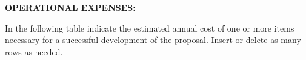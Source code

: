\documentclass[10pt]{article}
\begin{document}
\begin{comment}
\textbf{\uppercase{VIAJES DOMESTICOS: }}
\vspace{15pt}

\begin{tabular}{l|l|l|}
\cline{2-3}
                             & Destino & No. de días \\ \cline{2-3} 
                             &             &             \\ \hline
\multicolumn{1}{|l|}{Año 1} &   Desconocido          &     5        \\ \hline
\multicolumn{1}{|l|}{Año 2} &      Desconocido       &     5        \\ \hline
\multicolumn{1}{|l|}{Year 3} &          &           \\ \hline
\end{tabular}
\vspace{15pt}

El objetivo principal de los viajes domésticos es el de diseminar el trabajo realizado durante la ejecución del proyecto en la Comunidad chilena de Machine Learning, Descubrimiento de Conocimiento desde Grandes Bases de Datos y Reconocimiento de Patrones. Se espera también comenzar a colaborar con distintos investigadores de universidades chilenas con temas afines. Se planifica asistir a 2 conferencias nacionales durante la ejecución del proyecto. La tarifa aérea estimada es de M\$250 y un viatico diario de M\$60 por 5 días. El costo total por año asciende a M\$550.

\end{comment}

\pagebreak{}
\noindent \textbf{\uppercase{OPERATIONAL EXPENSES: }}

\vspace{15pt}
\noindent In the following table indicate the estimated annual cost of one or more items
necessary for a successful development of the proposal. Insert or delete as many
rows as needed.
\end{document}
